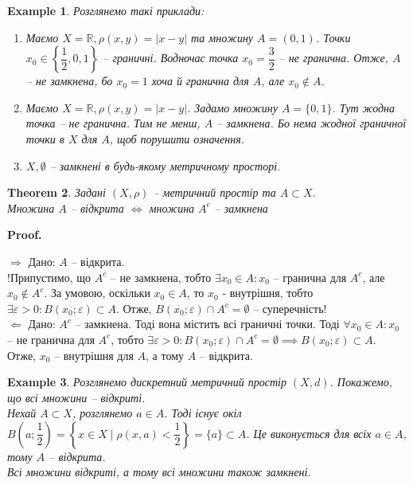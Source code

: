\documentclass[a4paper, 10pt]{article}
\makeatletter
\def\rightproof{$\boxed{\Rightarrow}$ }
\def\leftproof{$\boxed{\Leftarrow}$ }
\theoremstyle{theoremdd}
\newtheorem{theorem}{Theorem}[subsection]
\theoremstyle{theoremdd}
\theoremstyle{theoremdd}
\theoremstyle{theoremdd}
\newtheorem{example}[theorem]{Example}
\theoremstyle{theoremdd}
\theoremstyle{theoremdd}
\theoremstyle{theoremdd}
\theoremstyle{theoremdd}
\renewenvironment{proof}[1][Proof.\\]{\par
\pushQED{\hfill \qed}%
\normalfont \topsep6\p@\@plus6\p@\relax
\trivlist
\item\relax
{\bfseries
#1\@addpunct{.}}\hspace\labelsep\ignorespaces
}{%
\popQED\endtrivlist\@endpefalse
}
\makeatother
\begin{document}
\begin{example}
Розглянемо такі приклади:
\begin{enumerate}[wide=0pt,label={\arabic*)}]
\item Маємо $X = \mathbb{R}, \rho(x,y) = |x-y|$ та множину $A = (0,1)$. Точки $x_0 \in \left\{\dfrac{1}{2}, 0, 1\right\}$ -- граничні. Водночас точка $x_0 = \dfrac{3}{2}$ -- не гранична. Отже, $A$ -- не замкнена, бо $x_0 = 1$ хоча й гранична для $A$, але $x_0 \notin A$.
\item Маємо $X = \mathbb{R}, \rho(x,y) = |x-y|$. Задамо множину $A = \{0,1 \}$. Тут жодна точка -- не гранична. Тим не менш, $A$ -- замкнена. Бо нема жодної граничної точки в $X$ для $A$, щоб порушити означення.
\item $X, \emptyset$ -- замкнені в будь-якому метричному просторі.
\end{enumerate}
\end{example}

\begin{theorem}
\label{set_open_iff_complement_set_closed}
Задані $(X,\rho)$ -- метричний простір та $A \subset X$.\\
Множина $A$ -- відкрита $\iff$ множина $A^c$ -- замкнена
\end{theorem}

\begin{proof}
\rightproof Дано: $A$ -- відкрита.\\
!Припустимо, що $A^c$ -- не замкнена, тобто $\exists x_0 \in A: x_0$ -- гранична для $A^c$, але $x_0 \notin A^c$. За умовою, оскільки $x_0 \in A$, то $x_0$ - внутрішня, тобто $\exists \varepsilon > 0: B(x_0;\varepsilon) \subset A$. Отже, $B(x_0;\varepsilon) \cap A^c = \emptyset$ -- суперечність!
\bigskip \\
\leftproof Дано: $A^c$ -- замкнена. Тоді вона містить всі граничні точки. Тоді $\forall x_0 \in A: x_0$ -- не гранична для $A^c$, тобто $\exists \varepsilon > 0: B(x_0;\varepsilon) \cap A^c = \emptyset \implies B(x_0;\varepsilon) \subset A$. Отже, $x_0$ -- внутрішня для $A$, а тому $A$ -- відкрита.
\end{proof}

\begin{example}
Розглянемо дискретний метричний простір $(X,d)$. Покажемо, що всі множини -- відкриті.\\
Нехай $A \subset X$, розглянемо $a \in A$. Тоді існує окіл $B\left(a;\dfrac{1}{2}\right) = \left\{ x \in X \mid \rho(x,a) < \dfrac{1}{2} \right\} = \{a\} \subset A$. Це виконується для всіх $a \in A$, тому $A$ -- відкрита.\\
Всі множини відкриті, а тому всі множини також замкнені.
\end{example}
\end{document}
